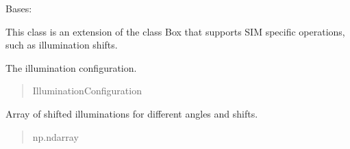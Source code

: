 \documentclass[letterpaper,10pt,english]{sphinxmanual}
\begin{document}
\begin{fulllineitems}
\begin{fulllineitems}
\begin{quote}
\begin{description}
\end{description}\end{quote}

\end{fulllineitems}


\end{fulllineitems}


\begin{fulllineitems}
\label{\detokenize{source/Box:Box.BoxSIM}}
\pysigstartsignatures
\pysiglinewithargsret
{}
{\sphinxparamcomma {}\sphinxparamcomma {}\sphinxparamcomma {}}
{}
\pysigstopsignatures
\sphinxAtStartPar
Bases: {\hyperref[\detokenize{source/Box:Box.Box}]{}}

\sphinxAtStartPar
This class is an extension of the class Box that supports SIM specific operations,
such as illumination shifts.

\begin{fulllineitems}
\label{\detokenize{source/Box:Box.BoxSIM.illumination}}
\pysigstartsignatures
\pysigline
{}
\pysigstopsignatures
\sphinxAtStartPar
The illumination configuration.
\begin{quote}\begin{description}
\sphinxAtStartPar
IlluminationConfiguration

\end{description}\end{quote}

\end{fulllineitems}


\begin{fulllineitems}
\label{\detokenize{source/Box:Box.BoxSIM.illuminations_shifted}}
\pysigstartsignatures
\pysigline
{}
\pysigstopsignatures
\sphinxAtStartPar
Array of shifted illuminations for different angles and shifts.
\begin{quote}\begin{description}
\sphinxAtStartPar
np.ndarray


\end{description}
\end{quote}
\end{fulllineitems}
\end{fulllineitems}
\end{document}
